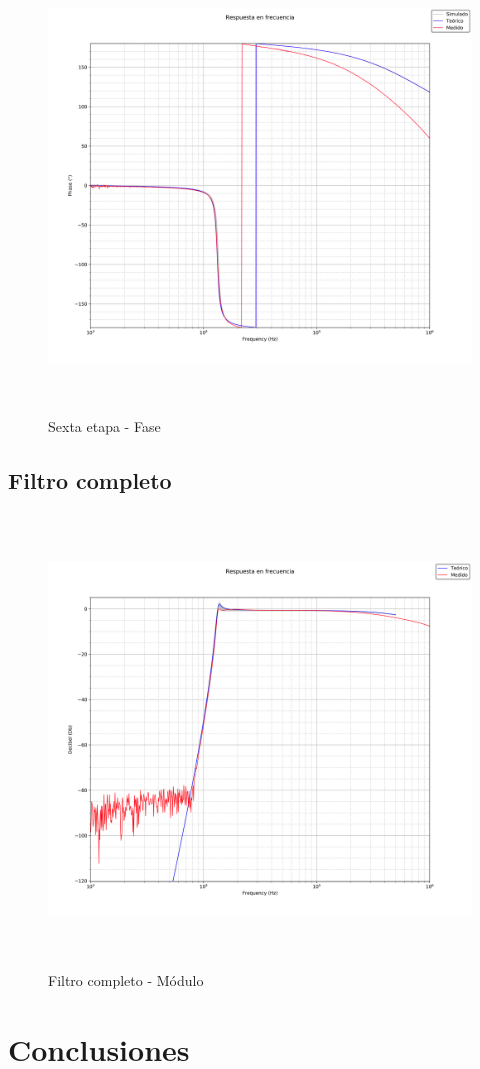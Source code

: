  \begin{figure}[H] %
	\centering
	\includegraphics[width=12cm,height=12cm,keepaspectratio]{../Imagenes/UNIVERSAL_PHA.png}
	\caption{Sexta etapa - Fase}
	\label{6P}
\end{figure}

\subsection{Filtro completo}

 \begin{figure}[H] %
	\centering
	\includegraphics[width=12cm,height=12cm,keepaspectratio]{../Imagenes/ALL_MOD.png}
	\caption{Filtro completo - M\'odulo}
	\label{completo}
\end{figure}

\section{Conclusiones}